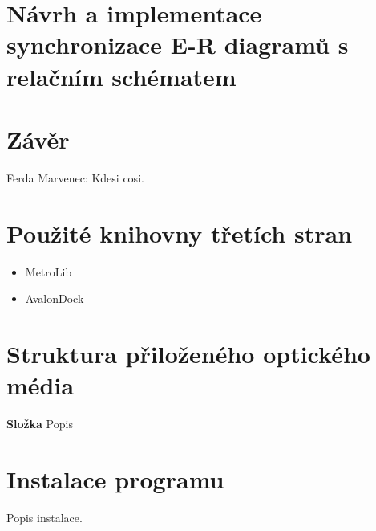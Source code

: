 \documentclass[czech,bachelor,public,dept460,male,oneside]{diploma}
\begin{document}
\section{Návrh a implementace synchronizace E-R diagramů s relačním schématem}

\section{Závěr}

\newpage

\begin{thebibliography}{99}
	 Ferda Marvenec: Kdesi cosi.
\end{thebibliography}


\appendix
\section{Použité knihovny třetích stran}
\begin{itemize}
	\item MetroLib
	\item AvalonDock
\end{itemize}

\section{Struktura přiloženého optického média}
\textbf{Složka} Popis

\section{Instalace programu}
Popis instalace.
\end{document}
